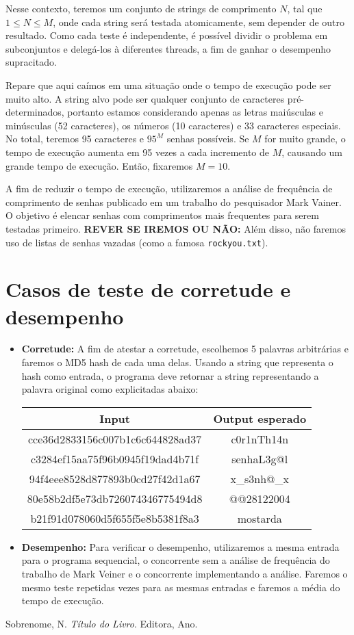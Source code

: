 \documentclass[12pt, a4paper]{article}
\begin{document}
Nesse contexto, teremos um conjunto de strings de comprimento $N$, tal que $1 \leq N \leq M$, onde cada string será testada atomicamente, sem depender de outro resultado. Como cada teste é independente, é possível dividir o problema em subconjuntos e delegá-los à diferentes threads, a fim de ganhar o desempenho supracitado.

Repare que aqui caímos em uma situação onde o tempo de execução pode ser muito alto. A string alvo pode ser qualquer conjunto de caracteres pré-determinados, portanto estamos considerando apenas as letras maiúsculas e minúsculas (52 caracteres), os números (10 caracteres) e 33 caracteres especiais. No total, teremos 95 caracteres e $95^{M}$ senhas possíveis. Se $M$ for muito grande, o tempo de execução aumenta em 95 vezes a cada incremento de $M$, causando um grande tempo de execução. Então, fixaremos $M=10$.

A fim de reduzir o tempo de execução, utilizaremos a análise de frequência de comprimento de senhas publicado em um trabalho do pesquisador Mark Vainer. O objetivo é elencar senhas com comprimentos mais frequentes para serem testadas primeiro. \textbf{REVER SE IREMOS OU NÃO: }Além disso, não faremos uso de listas de senhas vazadas (como a famosa \texttt{rockyou.txt}).

\section{Casos de teste de corretude e desempenho}
\begin{itemize}
    \item \textbf{Corretude:} A fim de atestar a corretude, escolhemos 5 palavras arbitrárias e faremos o MD5 hash de cada uma delas. Usando a string que representa o hash como entrada, o programa deve retornar a string representando a palavra original como explicitadas abaixo:
    \begin{center}
    \begin{tabular}{ |c|c| } 
     \hline
     Input & Output esperado \\
     \hline
     cce36d2833156c007b1c6c644828ad37 & c0r1nTh14n \\
     c3284ef15aa75f96b0945f19dad4b71f & senhaL3g@l \\
     94f4eee8528d877893b0cd27f42d1a67 & x\_s3nh@\_x \\
     80e58b2df5e73db726074346775494d8 & @@28122004 \\
     b21f91d078060d5f655f5e8b5381f8a3 & mostarda  \\
     \hline
    \end{tabular}

    \end{center}

        \item \textbf{Desempenho:} Para verificar o desempenho, utilizaremos a mesma entrada para o programa sequencial, o concorrente sem a análise de frequência do trabalho de Mark Veiner e o concorrente implementando a análise. Faremos o mesmo teste repetidas vezes para as mesmas entradas e faremos a média do tempo de execução.
\end{itemize}

\begin{thebibliography}{9}
    Sobrenome, N. \textit{Título do Livro}. Editora, Ano.


\end{thebibliography}
\end{document}
